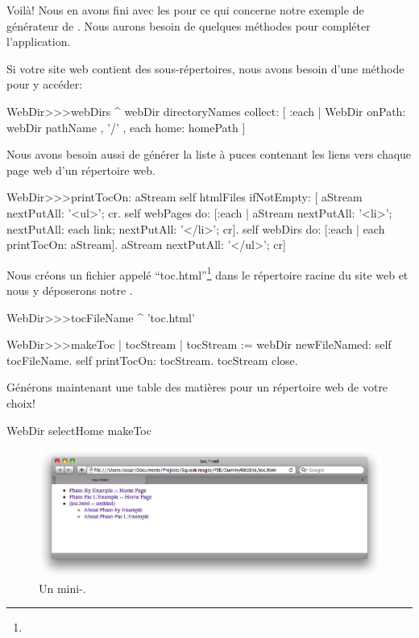 \documentclass[a4paper,10pt,twoside]{book}
\begin{document}
Voilà! Nous en avons fini avec les \expregs pour ce qui concerne notre
exemple de générateur de \sitemap.
Nous aurons besoin de quelques méthodes pour compléter l'application.


Si votre site web contient des sous-répertoires, nous avons besoin
d'une méthode pour y accéder:
\begin{code}{}
WebDir>>>webDirs
	^ webDir directoryNames
		collect: [ :each | WebDir onPath: webDir pathName , '/' , each home: homePath ]
\end{code}

Nous avons besoin aussi de générer la liste à puces contenant les
liens vers chaque page web d'un répertoire web.
\begin{code}{}
WebDir>>>printTocOn: aStream 
	self htmlFiles
		ifNotEmpty: [
			aStream nextPutAll: '<ul>'; cr.
			self webPages
				do: [:each | aStream nextPutAll: '<li>';
						 nextPutAll: each link;
						 nextPutAll: '</li>'; cr].
			self webDirs
				do: [:each | each printTocOn: aStream].
			aStream nextPutAll: '</ul>'; cr]
\end{code}

Nous créons un fichier appelé ``toc.html''\footnote{}
dans le répertoire racine du site web et nous y déposerons notre
\sitemap.
\begin{code}{}
WebDir>>>tocFileName
	^ 'toc.html'

WebDir>>>makeToc
	| tocStream |
	tocStream := webDir newFileNamed: self tocFileName.
	self printTocOn: tocStream.
	tocStream close.
\end{code}

Générons maintenant une table des matières pour un répertoire web de
votre choix!
\begin{code}{}
WebDir selectHome makeToc
\end{code}

\begin{figure}[tbh]
\begin{center}
\includegraphics[width=\textwidth]{PBE-toc}
\caption{Un mini-\sitemap.}
\end{center}
\end{figure}
\end{document}
